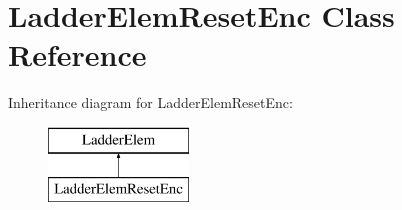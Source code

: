\hypertarget{class_ladder_elem_reset_enc}{\section{Ladder\-Elem\-Reset\-Enc Class Reference}
\label{class_ladder_elem_reset_enc}
}
Inheritance diagram for Ladder\-Elem\-Reset\-Enc\-:\begin{figure}[H]
\begin{center}
\leavevmode
\includegraphics[height=2.000000cm]{class_ladder_elem_reset_enc}
\end{center}
\end{figure}
